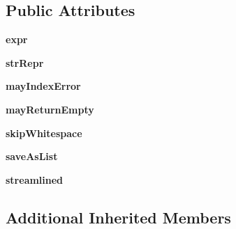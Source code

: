 \subsection*{Public Attributes}
\begin{DoxyCompactItemize}
\item 
\mbox{\label{classsetuptools_1_1__vendor_1_1pyparsing_1_1_forward_a159a0ef6fccd6776df20923161748478}} 
{\bfseries expr}
\item 
\mbox{\label{classsetuptools_1_1__vendor_1_1pyparsing_1_1_forward_ad66d918d824383a59eb3e18c2c454b67}} 
{\bfseries str\+Repr}
\item 
\mbox{\label{classsetuptools_1_1__vendor_1_1pyparsing_1_1_forward_a9643389ffa33fc42ceba3e3abc1a58c0}} 
{\bfseries may\+Index\+Error}
\item 
\mbox{\label{classsetuptools_1_1__vendor_1_1pyparsing_1_1_forward_aecdbb781823828da570a5ac6b7b605e5}} 
{\bfseries may\+Return\+Empty}
\item 
\mbox{\label{classsetuptools_1_1__vendor_1_1pyparsing_1_1_forward_aa5fc81471fce221d3df106be0e05572c}} 
{\bfseries skip\+Whitespace}
\item 
\mbox{\label{classsetuptools_1_1__vendor_1_1pyparsing_1_1_forward_a7bd0017c92cb1ec61d18ea9d7b656ffd}} 
{\bfseries save\+As\+List}
\item 
\mbox{\label{classsetuptools_1_1__vendor_1_1pyparsing_1_1_forward_a00fb86e8b428a2db455187abb6f86100}} 
{\bfseries streamlined}
\end{DoxyCompactItemize}
\subsection*{Additional Inherited Members}



